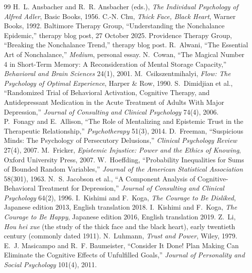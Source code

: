 \documentclass[11pt]{article}
\theoremstyle{definition}
\begin{document}
\begin{thebibliography}{99}
 H.~L. Ansbacher and R.~R. Ansbacher (eds.), \emph{The Individual Psychology of Alfred Adler}, Basic Books, 1956.
 C.-N. Chu, \emph{Thick Face, Black Heart}, Warner Books, 1992.
 Baltimore Therapy Group, ``Understanding the Nonchalance Epidemic,'' therapy blog post, 27 October 2025.
 Providence Therapy Group, ``Breaking the Nonchalance Trend,'' therapy blog post.
 R.~Alwani, ``The Essential Art of Nonchalance,'' \emph{Medium}, personal essay.
 N.~Cowan, ``The Magical Number 4 in Short-Term Memory: A Reconsideration of Mental Storage Capacity,'' \emph{Behavioral and Brain Sciences} 24(1), 2001.
 M.~Csikszentmihalyi, \emph{Flow: The Psychology of Optimal Experience}, Harper \& Row, 1990.
 S.~Dimidjian et al., ``Randomized Trial of Behavioral Activation, Cognitive Therapy, and Antidepressant Medication in the Acute Treatment of Adults With Major Depression,'' \emph{Journal of Consulting and Clinical Psychology} 74(4), 2006.
 P.~Fonagy and E.~Allison, ``The Role of Mentalizing and Epistemic Trust in the Therapeutic Relationship,'' \emph{Psychotherapy} 51(3), 2014.
 D.~Freeman, ``Suspicious Minds: The Psychology of Persecutory Delusions,'' \emph{Clinical Psychology Review} 27(4), 2007.
 M.~Fricker, \emph{Epistemic Injustice: Power and the Ethics of Knowing}, Oxford University Press, 2007.
 W.~Hoeffding, ``Probability Inequalities for Sums of Bounded Random Variables,'' \emph{Journal of the American Statistical Association} 58(301), 1963.
 N.~S. Jacobson et al., ``A Component Analysis of Cognitive-Behavioral Treatment for Depression,'' \emph{Journal of Consulting and Clinical Psychology} 64(2), 1996.
 I.~Kishimi and F.~Koga, \emph{The Courage to Be Disliked}, Japanese edition 2013, English translation 2018.
 I.~Kishimi and F.~Koga, \emph{The Courage to Be Happy}, Japanese edition 2016, English translation 2019.
 Z.~Li, \emph{Hou hei xue} (the study of the thick face and the black heart), early twentieth century (commonly dated 1911).
 N.~Luhmann, \emph{Trust and Power}, Wiley, 1979.
 E.~J. Masicampo and R.~F. Baumeister, ``Consider It Done! Plan Making Can Eliminate the Cognitive Effects of Unfulfilled Goals,'' \emph{Journal of Personality and Social Psychology} 101(4), 2011.

\end{thebibliography}
\end{document}
